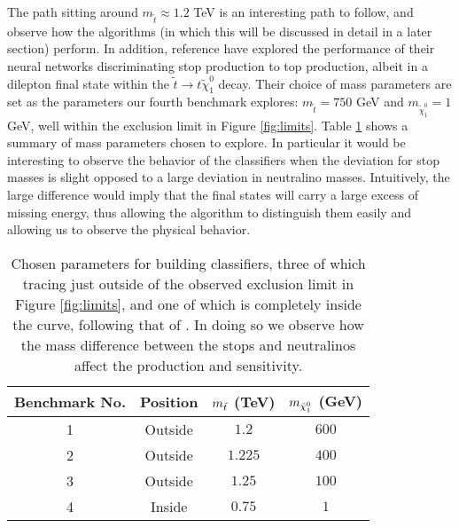 The path sitting around $ m_{\tilde{t}} \approx 1.2$ TeV is an interesting path to follow, and observe how the algorithms (in which this will be discussed in detail in a later section) perform. In addition, reference \cite{roxlo2018opening} have explored the performance of their neural networks discriminating stop production to top production, albeit in a dilepton final state within the $\tilde{t} \rightarrow t \tilde{\chi}_1^0$ decay. Their choice of mass parameters are set as the parameters our fourth benchmark explores: $m_{\tilde{t}} =750$ GeV and $m_{\tilde{\chi}_1^0} = 1$ GeV, well within the exclusion limit in Figure \ref{fig:limits}. Table \ref{tab:benchmarks} shows a summary of mass parameters chosen to explore. In particular it would be interesting to observe the behavior of the classifiers when the deviation for stop masses is slight opposed to a large deviation in neutralino masses. Intuitively, the large difference would imply that the final states will carry a large excess of missing energy, thus allowing the algorithm to distinguish them easily and allowing us to observe the physical behavior. 

\begin{table}[htbp]
    \centering
    \begin{tabular}{c|c|c|c} 
    \toprule
    Benchmark No. & Position & $m_{\Tilde{t}}$ (TeV) & $m_{\Tilde{\chi}_1^0}$ (GeV) \\
    \midrule
    \rowcolor{gray!6} 1 & Outside & $ 1.2 $ & $ 600 $ \\
    2 & Outside & $ 1.225 $ & $ 400 $ \\
    \rowcolor{gray!6} 3 & Outside & $ 1.25 $ & $ 100 $ \\
    4 & Inside & $ 0.75 $ & $ 1 $\\
    \bottomrule
    \end{tabular}
    \caption{Chosen parameters for building classifiers, three of which tracing just outside of the observed exclusion limit in Figure \ref{fig:limits}, and one of which is completely inside the curve, following that of \cite{roxlo2018opening}. In doing so we observe how the mass difference between the stops and neutralinos affect the production and sensitivity.} 
    \label{tab:benchmarks}
\end{table}

